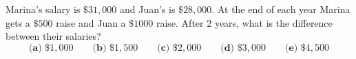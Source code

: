 Marina's salary is $\$31{,}000$ and Juan's is $\$28{,}000$. At the end of each year Marina gets a $\$500$ raise and Juan a $\$1000$ raise. After $2$ years, what is the difference between their salaries?
\[
\textbf{(a) } \$1{,}000\qquad\textbf{(b) } \$1{,}500\qquad\textbf{(c) } \$2{,}000\qquad\textbf{(d) } \$3{,}000\qquad\textbf{(e) } \$4{,}500
\]
